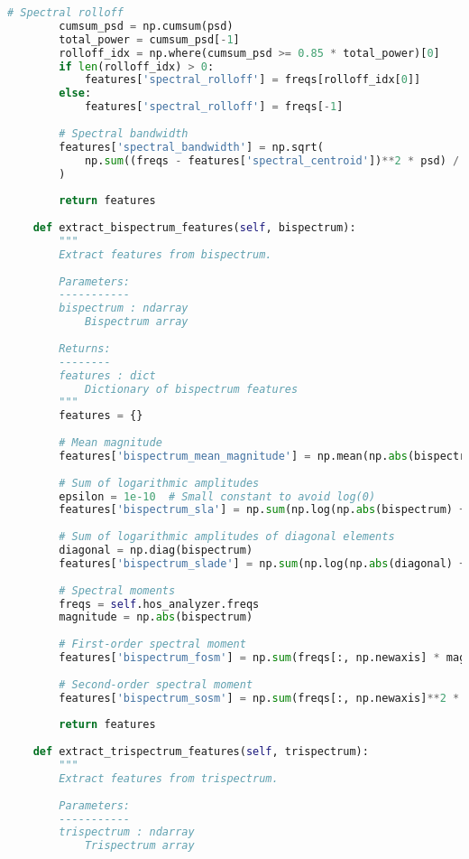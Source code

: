 \begin{lstlisting}[language=Python, caption=FeatureExtractor class for comprehensive feature extraction]
        # Spectral rolloff
        cumsum_psd = np.cumsum(psd)
        total_power = cumsum_psd[-1]
        rolloff_idx = np.where(cumsum_psd >= 0.85 * total_power)[0]
        if len(rolloff_idx) > 0:
            features['spectral_rolloff'] = freqs[rolloff_idx[0]]
        else:
            features['spectral_rolloff'] = freqs[-1]
        
        # Spectral bandwidth
        features['spectral_bandwidth'] = np.sqrt(
            np.sum((freqs - features['spectral_centroid'])**2 * psd) / np.sum(psd)
        )
        
        return features
    
    def extract_bispectrum_features(self, bispectrum):
        """
        Extract features from bispectrum.
        
        Parameters:
        -----------
        bispectrum : ndarray
            Bispectrum array
            
        Returns:
        --------
        features : dict
            Dictionary of bispectrum features
        """
        features = {}
        
        # Mean magnitude
        features['bispectrum_mean_magnitude'] = np.mean(np.abs(bispectrum))
        
        # Sum of logarithmic amplitudes
        epsilon = 1e-10  # Small constant to avoid log(0)
        features['bispectrum_sla'] = np.sum(np.log(np.abs(bispectrum) + epsilon))
        
        # Sum of logarithmic amplitudes of diagonal elements
        diagonal = np.diag(bispectrum)
        features['bispectrum_slade'] = np.sum(np.log(np.abs(diagonal) + epsilon))
        
        # Spectral moments
        freqs = self.hos_analyzer.freqs
        magnitude = np.abs(bispectrum)
        
        # First-order spectral moment
        features['bispectrum_fosm'] = np.sum(freqs[:, np.newaxis] * magnitude) / np.sum(magnitude)
        
        # Second-order spectral moment
        features['bispectrum_sosm'] = np.sum(freqs[:, np.newaxis]**2 * magnitude) / np.sum(magnitude)
        
        return features
    
    def extract_trispectrum_features(self, trispectrum):
        """
        Extract features from trispectrum.
        
        Parameters:
        -----------
        trispectrum : ndarray
            Trispectrum array
            

\end{lstlisting}

